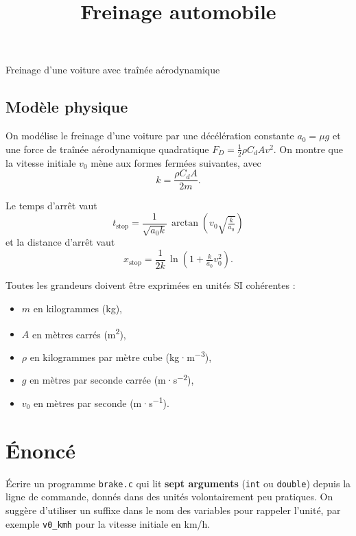 \documentclass[french,a4paper,addpoints,11pt]{exam}
\title{Freinage automobile}
\begin{document}
\maketitle
\thispagestyle{headandfoot}

    \begin{questions}
        \question Freinage d'une voiture avec traînée aérodynamique

        \begin{multicols}{2}
        \section*{Modèle physique}

        On modélise le freinage d'une voiture par une décélération constante $a_0 = \mu g$ et une force de traînée aérodynamique quadratique
        $F_D = \tfrac{1}{2}\rho C_d A v^2$. On montre que la vitesse initiale $v_0$ mène aux formes fermées suivantes, avec
        \[ k = \frac{\rho C_d A}{2m}. \]

        Le temps d'arrêt vaut
        \[
            t_{\text{stop}} = \frac{1}{\sqrt{a_0 k}}\,\arctan\!\left(v_0\sqrt{\tfrac{k}{a_0}}\right)
        \]
        et la distance d'arrêt vaut
        \[
            x_{\text{stop}} = \frac{1}{2k}\,\ln\!\left(1 + \tfrac{k}{a_0}v_0^2\right).
        \]

        Toutes les grandeurs doivent être exprimées en unités SI cohérentes :
        \begin{itemize}
            \item $m$ en kilogrammes (kg),
            \item $A$ en mètres carrés (m\textsuperscript{2}),
            \item $\rho$ en kilogrammes par mètre cube (kg·m\textsuperscript{$-3$}),
            \item $g$ en mètres par seconde carrée (m·s\textsuperscript{$-2$}),
            \item $v_0$ en mètres par seconde (m·s\textsuperscript{$-1$}).
        \end{itemize}
        \end{multicols}

        \section*{Énoncé}

        Écrire un programme \texttt{brake.c} qui lit \textbf{sept arguments} (\texttt{int} ou \texttt{double}) depuis la ligne de commande, donnés dans des unités volontairement peu pratiques. On suggère d'utiliser un suffixe dans le nom des variables pour rappeler l'unité, par exemple \texttt{v0\_kmh} pour la vitesse initiale en km/h.


\end{questions}
\end{document}
